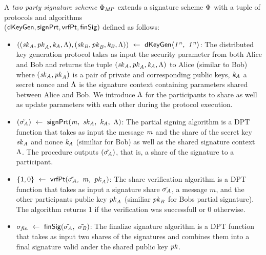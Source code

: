 \begin{definition}
    \label{def:sig:two-party-sig}

    A \emph{two party signature scheme $\Phi_{\mathit{MP}}$} extends a signature scheme $\Phi$ with a tuple of protocols and algorithms\\
    ($\mathsf{dKeyGen}, \mathsf{signPrt} , \mathsf{vrfPt}, \mathsf{finSig})$ defined as follows:

    \begin{itemize}
        \item $((\mathit{sk}_{\mathit{A}}, \mathit{pk}_{\mathit{A}}, \mathit{\mathit{k}_{\mathit{A}}}, \Lambda), (\mathit{sk}_{\mathit{B}}, \mathit{pk}_{\mathit{B}}, \mathit{\mathit{k}_{\mathit{B}}}, \Lambda)) ~\leftarrow~ \mathsf{dKeyGen}\langle \mathit{1^n} ,~ \mathit{1^n} \rangle$: The distributed key generation protocol takes as input the security parameter from both Alice and Bob and returns
        the tuple $(\mathit{sk}_{\mathit{A}}, \mathit{pk}_{\mathit{A}}, \mathit{\mathit{k}_{\mathit{A}}}, \Lambda)$ to Alice (similar to Bob) where $(\mathit{sk}_{\mathit{A}}, \mathit{pk}_{\mathit{A}})$ is a pair of private and corresponding public keys, $\mathit{\mathit{k}_{\mathit{A}}}$ a secret nonce and $\Lambda$ is the signature context containing parameters shared between Alice and Bob.
        We introduce $\Lambda$ for the participants to share as well as update parameters with each other during the protocol execution.

        \item $(\tilde{\sigma_{\mathit{A}}}) ~\leftarrow~ \mathsf{signPrt}(\mathit{m} ,~ \mathit{sk}_{\mathit{A}} ,~ \mathit{\mathit{k}_{\mathit{A}}} ,~ \Lambda)$: The partial signing algorithm is a DPT function that takes as input the message $\mathit{m}$ and the share of the secret key $\mathit{sk}_{\mathit{A}}$ and nonce $\mathit{\mathit{k}_{\mathit{A}}}$ (similiar for Bob) as well
        as the shared signature context $\Lambda$. The procedure outputs $(\tilde{\sigma_{\mathit{A}}})$, that is, a share of the signature to a participant.

        \item $\{1,0\} ~\leftarrow~ \mathsf{vrfPt}(\tilde{\sigma_{\mathit{A}}} ,~ \mathit{m} ,~ \mathit{pk}_{\mathit{A}})$: The share verification algorithm is a DPT function that takes as input a signature share $\tilde{\sigma_{\mathit{A}}}$, a message $m$, and the other participants public key $\mathit{pk}_{\mathit{A}}$ (similiar $\mathit{pk}_{\mathit{B}}$ for Bobs partial signature). The algorithm returns 1 if the verification was successfull or 0 otherwise.

        \item $\sigma_{\mathit{fin}} ~\leftarrow~ \mathsf{finSig}(\tilde{\sigma_{\mathit{A}}} ,~ \tilde{\sigma_{\mathit{B}}})$: The finalize signature algorithm is a DPT function that takes as input two shares of the signatures and combines them into a final signature valid ander the shared public key $\mathit{pk}$.

    \end{itemize}

\end{definition}

